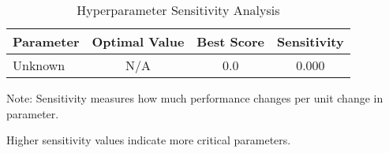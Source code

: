 
\begin{table}[htbp]
\centering
\caption{Hyperparameter Sensitivity Analysis}
\label{tab:hyperparameter_results}
\begin{tabular}{lccc}
\toprule
Parameter & Optimal Value & Best Score & Sensitivity \\
\midrule
Unknown & N/A & 0.0 & 0.000 \\

\bottomrule
\end{tabular}
\begin{tablenotes}
\small
\item Note: Sensitivity measures how much performance changes per unit change in parameter.
\item Higher sensitivity values indicate more critical parameters.
\end{tablenotes}
\end{table}
